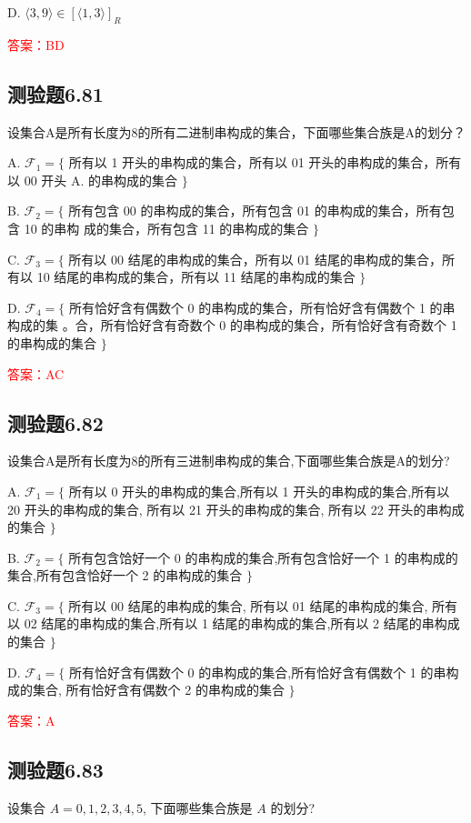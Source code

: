 \documentclass[UTF8, heading=true]{ctexart}
\begin{document}
D. $\langle 3,9\rangle \in[\langle 1,3\rangle]_R$

\textcolor{red}{答案：BD}

\subsection{测验题6.81}

设集合A是所有长度为8的所有二进制串构成的集合，下面哪些集合族是A的划分？

A. $\mathcal{F}_1=\{$ 所有以 1 开头的串构成的集合，所有以 01 开头的串构成的集合，所有以 00 开头 A. 的串构成的集合 $\}$

B. $\mathcal{F}_2=\{$ 所有包含 00 的串构成的集合，所有包含 01 的串构成的集合，所有包含 10 的串构
成的集合，所有包含 11 的串构成的集合 $\}$

C. $\mathcal{F}_3=\{$ 所有以 00 结尾的串构成的集合，所有以 01 结尾的串构成的集合，所有以 10 结尾的串构成的集合，所有以 11 结尾的串构成的集合 $\}$

D. $\mathcal{F}_4=\{$ 所有恰好含有偶数个 0 的串构成的集合，所有恰好含有偶数个 1 的串构成的集
。合，所有恰好含有奇数个 0 的串构成的集合，所有恰好含有奇数个 1 的串构成的集合 $\}$


\textcolor{red}{答案：AC}

\subsection{测验题6.82}

设集合A是所有长度为8的所有三进制串构成的集合,下面哪些集合族是A的划分?

A. $\mathcal{F}_1=\{$ 所有以 0 开头的串构成的集合,所有以 1 开头的串构成的集合,所有以 20 开头的串构成的集合, 所有以 21 开头的串构成的集合, 所有以 22 开头的串构成的集合 $\}$

B. $\mathcal{F}_2=\{$ 所有包含饸好一个 0 的串构成的集合,所有包含恰好一个 1 的串构成的集合,所有包含恰好一个 2 的串构成的集合 $\}$

C. $\mathcal{F}_3=\{$ 所有以 00 结尾的串构成的集合, 所有以 01 结尾的串构成的集合, 所有以 02 结尾的串构成的集合,所有以 1 结尾的串构成的集合,所有以 2 结尾的串构成的集合 $\}$

D. $\mathcal{F}_4=\{$ 所有恰好含有偶数个 0 的串构成的集合,所有恰好含有偶数个 1 的串构成的集合, 所有恰好含有偶数个 2 的串构成的集合 $\}$

\textcolor{red}{答案：A}

\subsection{测验题6.83}
设集合 $A={0,1,2,3,4,5}$, 下面哪些集合族是 $A$ 的划分?
\end{document}

